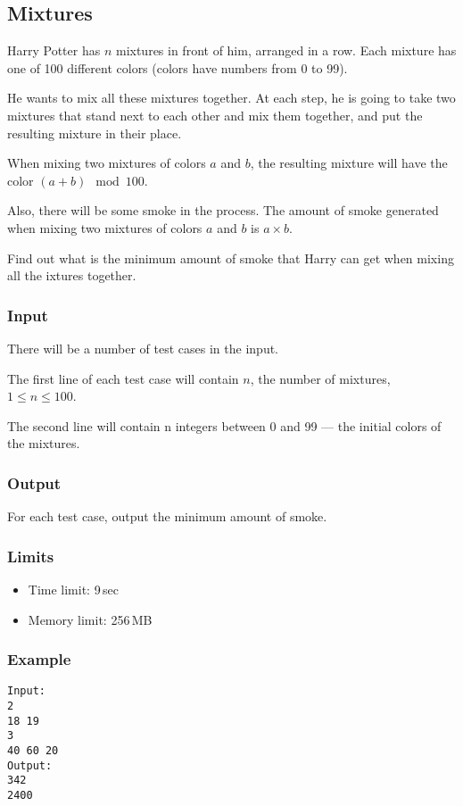 \subsection{Mixtures}

Harry Potter has $n$ mixtures in front of him, arranged in a row.
Each mixture has one of 100 different colors (colors have numbers from 0 to 99).

He wants to mix all these mixtures together.
At each step, he is going to take two mixtures that stand next to each other
and mix them together, and put the resulting mixture in their place.

When mixing two mixtures of colors $a$ and $b$,
the resulting mixture will have the color $(a+b) \mod 100$.

Also, there will be some smoke in the process.
The amount of smoke generated when mixing
two mixtures of colors $a$ and $b$ is $a\times b$.

Find out what is the minimum amount of smoke that Harry can get when mixing all the ixtures together.

\subsubsection*{Input}
There will be a number of test cases in the input.

The first line of each test case will contain $n$, the number of mixtures,
$1 \leq n \leq 100$.

The second line will contain n integers between 0 and 99
--- the initial colors of the mixtures.

\subsubsection*{Output}
For each test case, output the minimum amount of smoke.

\subsubsection*{Limits}
\begin{itemize}
    \item Time limit: 9\,sec
    \item Memory limit: 256\,MB
\end{itemize}



\subsubsection*{Example}
\begin{verbatim}
Input:
2
18 19
3
40 60 20
Output:
342
2400
\end{verbatim}


